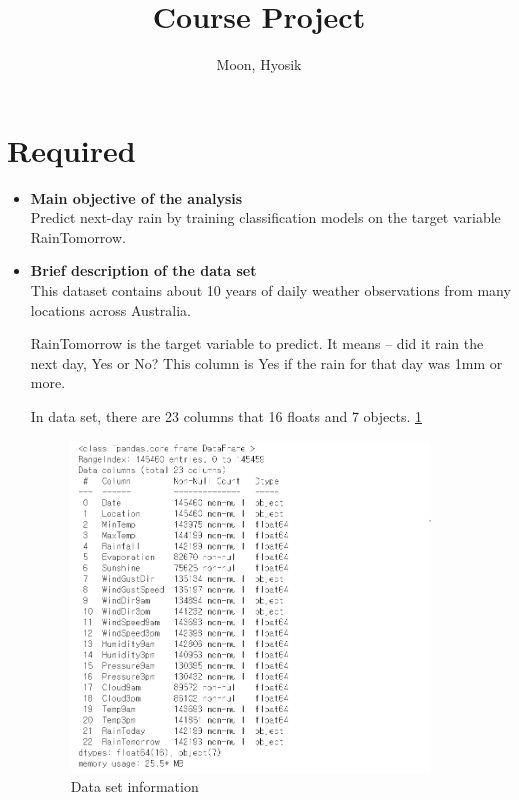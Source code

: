 \documentclass[12pt]{article}
\title{Course Project}
\author{
  Moon, Hyosik
  }
\begin{document}
\maketitle

\section{Required}

\begin{itemize}
\item \textbf{Main objective of the analysis} \\
Predict next-day rain by training classification models on the target variable RainTomorrow.

\item \textbf{Brief description of the data set} \\
This dataset contains about 10 years of daily weather observations from many locations across Australia.

RainTomorrow is the target variable to predict. It means -- did it rain the next day, Yes or No? This column is Yes if the rain for that day was 1mm or more.

In data set, there are 23 columns that 16 floats and 7 objects. \ref{data_info}

\begin{figure}[h!]
    \centering
    \includegraphics[width=0.9\textwidth]{figures/data_info.png}
    \caption{Data set information}\label{data_info}
\end{figure}


\end{itemize}
\end{document}
